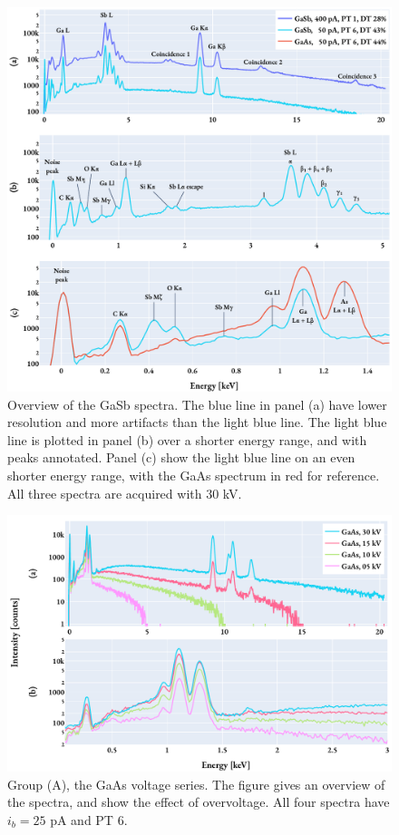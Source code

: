 \begin{figure}[hbtp]
    \centering
    \includegraphics[width=0.99\linewidth]{figures/results/spectrum_overviews.pdf}
    \caption{
        Overview of the GaSb spectra.
        The blue line in panel (a) have lower resolution and more artifacts than the light blue line.
        The light blue line is plotted in panel (b) over a shorter energy range, and with peaks annotated.
        Panel (c) show the light blue line on an even shorter energy range, with the GaAs spectrum in red for reference.
        All three spectra are acquired with $30$ kV.
    }
    \label{fig:results:overviewGaSb_withArtifacts}
\end{figure}

\begin{figure}[hbtp]
    \centering
    \includegraphics[width=0.85\linewidth]{figures/results/GaAs_voltages.pdf}
    \caption{
        Group (A), the GaAs voltage series.
        The figure gives an overview of the spectra, and show the effect of overvoltage.
        All four spectra have $i_b = 25$ pA and PT $6$.
    }
    \label{fig:results:GaAs_voltages}
\end{figure}


